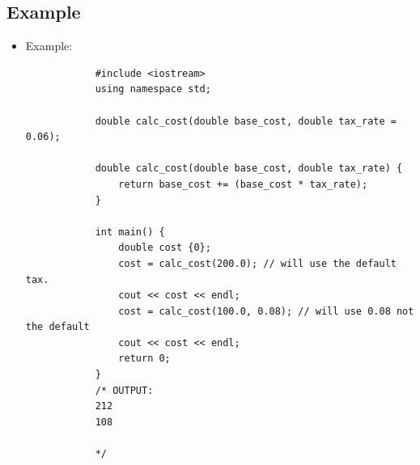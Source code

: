 \subsection{Example}
\begin{itemize}
    \item Example:
        \begin{verbatim}
            #include <iostream>
            using namespace std;

            double calc_cost(double base_cost, double tax_rate = 0.06);

            double calc_cost(double base_cost, double tax_rate) {
                return base_cost += (base_cost * tax_rate);
            }

            int main() {
                double cost {0};
                cost = calc_cost(200.0); // will use the default tax.
                cout << cost << endl;
                cost = calc_cost(100.0, 0.08); // will use 0.08 not the default
                cout << cost << endl;
                return 0;
            }
            /* OUTPUT:
            212
            108

            */
        \end{verbatim}
\end{itemize}


